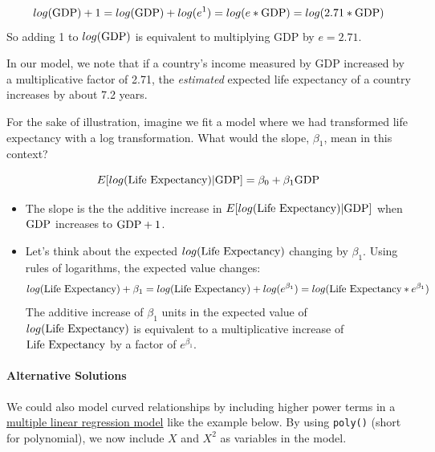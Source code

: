 \documentclass[
]{book}
\begin{document}
\[log(\hbox{GDP}) + 1 = log(\hbox{GDP}) + log(e^1) = log(e*\hbox{GDP}) = log(2.71*\hbox{GDP})\]
So adding 1 to \(log(\hbox{GDP})\) is equivalent to multiplying GDP by \(e=2.71\).

In our model, we note that if a country's income measured by GDP increased by a multiplicative factor of 2.71, the \emph{estimated} expected life expectancy of a country increases by about 7.2 years.

For the sake of illustration, imagine we fit a model where we had transformed life expectancy with a log transformation. What would the slope, \(\beta_1\), mean in this context?

\[E[log(\hbox{Life Expectancy}) | \hbox{GDP} ] = \beta_0 + \beta_1 \hbox{GDP}\]

\begin{itemize}
\item
  The slope is the the additive increase in \(E[log(\hbox{Life Expectancy}) | \hbox{GDP} ]\) when \(\hbox{GDP}\) increases to \(\hbox{GDP} + 1\).
\item
  Let's think about the expected \(log(\hbox{Life Expectancy})\) changing by \(\beta_1\). Using rules of logarithms, the expected value changes:
  \[log(\hbox{Life Expectancy}) + \beta_1 = log(\hbox{Life Expectancy}) + log(e^{\beta_1}) = log(\hbox{Life Expectancy} * e^{\beta_1}) \]
  The additive increase of \(\beta_1\) units in the expected value of \(log(\hbox{Life Expectancy})\) is equivalent to a multiplicative increase of \(\hbox{Life Expectancy}\) by a factor of \(e^{\beta_1}\).
\end{itemize}

\hypertarget{alternative-solutions}{%
\paragraph{Alternative Solutions}\label{alternative-solutions}}

We could also model curved relationships by including higher power terms in a \protect\hyperlink{multiple}{multiple linear regression model} like the example below. By using \texttt{poly()} (short for polynomial), we now include \(X\) and \(X^2\) as variables in the model.
\end{document}
